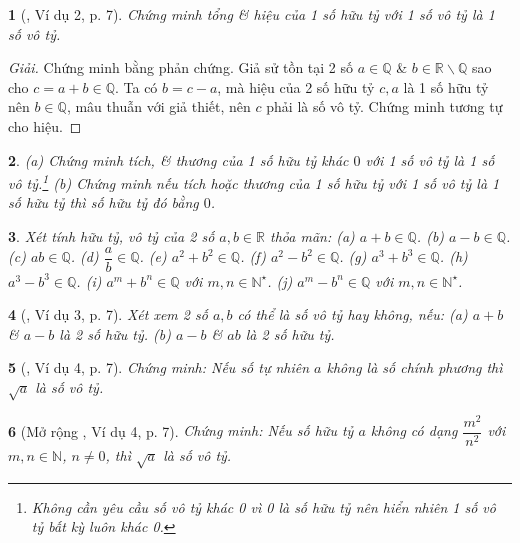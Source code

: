 \documentclass{article}
\newtheorem{baitoan}{}
\begin{document}
\begin{baitoan}[\cite{Binh_Toan_9_tap_1}, Ví dụ 2, p. 7]
	Chứng minh tổng \& hiệu của 1 số hữu tỷ với 1 số vô tỷ là 1 số vô tỷ.
\end{baitoan}

\begin{proof}[Giải]
	Chứng minh bằng phản chứng. Giả sử tồn tại 2 số $a\in\mathbb{Q}$ \& $b\in\mathbb{R}\backslash\mathbb{Q}$ sao cho $c = a + b\in\mathbb{Q}$. Ta có $b = c - a$, mà hiệu của 2 số hữu tỷ $c,a$ là 1 số hữu tỷ nên $b\in\mathbb{Q}$, mâu thuẫn với giả thiết, nên $c$ phải là số vô tỷ. Chứng minh tương tự cho hiệu.
\end{proof}

\begin{baitoan}
	(a) Chứng minh tích, \& thương của 1 số hữu tỷ khác $0$ với 1 số vô tỷ là 1 số vô tỷ.\footnote{Không cần yêu cầu số vô tỷ khác 0 vì 0 là số hữu tỷ nên hiển nhiên 1 số vô tỷ bất kỳ luôn khác 0.} (b) Chứng minh nếu tích hoặc thương của 1 số hữu tỷ với 1 số vô tỷ là 1 số hữu tỷ thì số hữu tỷ đó bằng $0$. 
\end{baitoan}

\begin{baitoan}
	Xét tính hữu tỷ, vô tỷ của 2 số $a,b\in\mathbb{R}$ thỏa mãn: (a) $a + b\in\mathbb{Q}$. (b) $a - b\in\mathbb{Q}$. (c) $ab\in\mathbb{Q}$. (d) $\dfrac{a}{b}\in\mathbb{Q}$. (e) $a^2 + b^2\in\mathbb{Q}$. (f) $a^2 - b^2\in\mathbb{Q}$. (g) $a^3 + b^3\in\mathbb{Q}$. (h) $a^3 - b^3\in\mathbb{Q}$. (i) $a^m + b^n\in\mathbb{Q}$ với $m,n\in\mathbb{N}^\star$. (j) $a^m - b^n\in\mathbb{Q}$ với $m,n\in\mathbb{N}^\star$.
\end{baitoan}

\begin{baitoan}[\cite{Binh_Toan_9_tap_1}, Ví dụ 3, p. 7]
	Xét xem 2 số $a,b$ có thể là số vô tỷ hay không, nếu: (a) $a + b$ \& $a - b$ là 2 số hữu tỷ. (b) $a - b$ \& $ab$ là 2 số hữu tỷ.
\end{baitoan}

\begin{baitoan}[\cite{Binh_Toan_9_tap_1}, Ví dụ 4, p. 7]
	Chứng minh: Nếu số tự nhiên $a$ không là số chính phương thì $\sqrt{a}$ là số vô tỷ.
\end{baitoan}

\begin{baitoan}[Mở rộng \cite{Binh_Toan_9_tap_1}, Ví dụ 4, p. 7]
	Chứng minh: Nếu số hữu tỷ $a$ không có dạng $\dfrac{m^2}{n^2}$ với $m,n\in\mathbb{N}$, $n\ne0$, thì $\sqrt{a}$ là số vô tỷ.
\end{baitoan}
\end{document}
